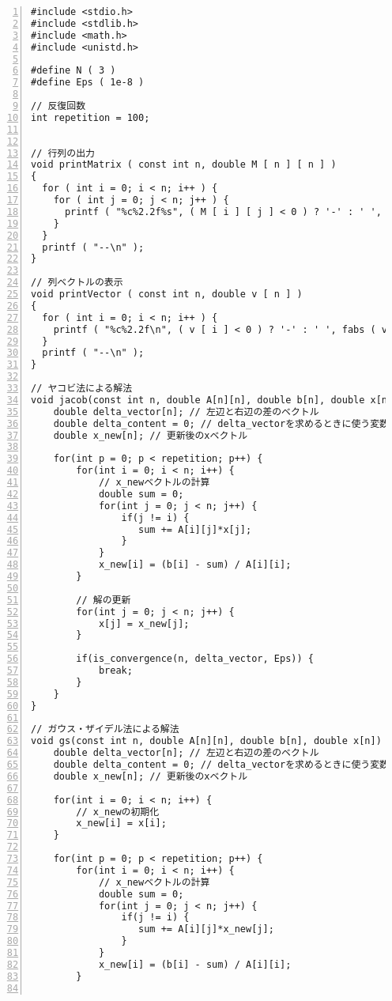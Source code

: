 \documentclass[a4paper]{jsarticle}
\begin{document}
\begin{lstlisting}[caption={\texttt{作成した全プログラム}}, numbers={left}, label={all_solution_code}]
#include <stdio.h>
#include <stdlib.h>
#include <math.h>
#include <unistd.h>

#define N ( 3 )
#define Eps ( 1e-8 )

// 反復回数
int repetition = 100;


// 行列の出力
void printMatrix ( const int n, double M [ n ] [ n ] )
{
  for ( int i = 0; i < n; i++ ) {
    for ( int j = 0; j < n; j++ ) {
      printf ( "%c%2.2f%s", ( M [ i ] [ j ] < 0 ) ? '-' : ' ', fabs ( M [ i ] [ j ] ), ( j == n - 1 ) ? "\n" : " " );
    }
  }
  printf ( "--\n" );
}

// 列ベクトルの表示
void printVector ( const int n, double v [ n ] )
{
  for ( int i = 0; i < n; i++ ) {
    printf ( "%c%2.2f\n", ( v [ i ] < 0 ) ? '-' : ' ', fabs ( v [ i ] ) );
  }
  printf ( "--\n" );
}

// ヤコビ法による解法
void jacob(const int n, double A[n][n], double b[n], double x[n]) {
    double delta_vector[n]; // 左辺と右辺の差のベクトル
    double delta_content = 0; // delta_vectorを求めるときに使う変数
    double x_new[n]; // 更新後のxベクトル

    for(int p = 0; p < repetition; p++) {
        for(int i = 0; i < n; i++) {
            // x_newベクトルの計算
            double sum = 0;
            for(int j = 0; j < n; j++) {
                if(j != i) {
                   sum += A[i][j]*x[j];
                }
            }
            x_new[i] = (b[i] - sum) / A[i][i];
        }

        // 解の更新
        for(int j = 0; j < n; j++) {
            x[j] = x_new[j];
        }

        if(is_convergence(n, delta_vector, Eps)) {
            break;
        }
    }
}

// ガウス・ザイデル法による解法
void gs(const int n, double A[n][n], double b[n], double x[n]) {
    double delta_vector[n]; // 左辺と右辺の差のベクトル
    double delta_content = 0; // delta_vectorを求めるときに使う変数
    double x_new[n]; // 更新後のxベクトル

    for(int i = 0; i < n; i++) {
        // x_newの初期化
        x_new[i] = x[i];
    }

    for(int p = 0; p < repetition; p++) {
        for(int i = 0; i < n; i++) {
            // x_newベクトルの計算
            double sum = 0;
            for(int j = 0; j < n; j++) {
                if(j != i) {
                   sum += A[i][j]*x_new[j];
                }
            }
            x_new[i] = (b[i] - sum) / A[i][i];
        }


\end{lstlisting}
\end{document}
